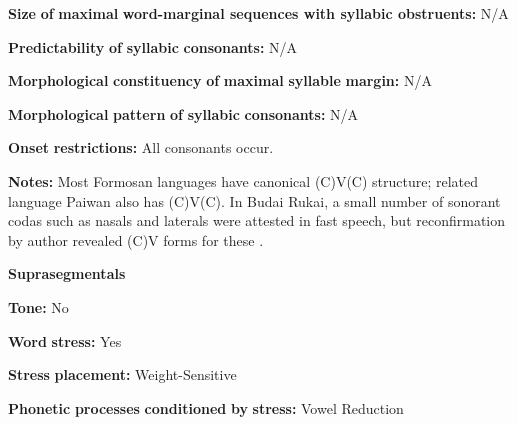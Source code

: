 \documentclass[output=paper]{langsci/langscibook}
\begin{document}
\begin{styleBody}
\textbf{Size} \textbf{of} \textbf{maximal} \textbf{word{}-marginal sequences with syllabic obstruents:} N/A
\end{styleBody}

\begin{styleBody}
\textbf{Predictability} \textbf{of} \textbf{syllabic} \textbf{consonants:} N/A
\end{styleBody}

\begin{styleBody}
\textbf{Morphological} \textbf{constituency} \textbf{of} \textbf{maximal} \textbf{syllable} \textbf{margin:} N/A
\end{styleBody}

\begin{styleBody}
\textbf{Morphological} \textbf{pattern} \textbf{of} \textbf{syllabic} \textbf{consonants:} N/A
\end{styleBody}

\begin{styleBody}
\textbf{Onset} \textbf{restrictions:} All consonants occur.
\end{styleBody}

\begin{styleBody}
\textbf{Notes:} Most Formosan languages have canonical (C)V(C) structure; related language Paiwan also has (C)V(C). In Budai Rukai, a small number of sonorant codas such as nasals and laterals were attested in fast speech, but reconfirmation by author revealed (C)V forms for these \citep[213]{Chen2006}.
\end{styleBody}

\begin{styleBody}
\textbf{Suprasegmentals}
\end{styleBody}

\begin{styleBody}
\textbf{Tone:} No
\end{styleBody}

\begin{styleBody}
\textbf{Word} \textbf{stress:} Yes
\end{styleBody}

\begin{styleBody}
\textbf{Stress} \textbf{placement:} Weight-Sensitive
\end{styleBody}

\begin{styleBody}
\textbf{Phonetic} \textbf{processes} \textbf{conditioned} \textbf{by} \textbf{stress:} Vowel Reduction
\end{styleBody}
\end{document}
